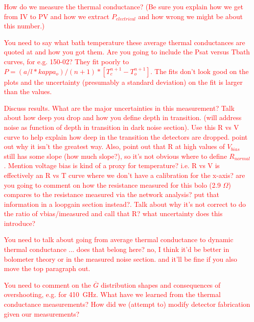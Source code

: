 
\textcolor{red}{How do we measure the thermal conductance? (Be sure you explain how we get from IV to PV and how we extract $P_{electrical}$ and how wrong we might be about this number.)}

\textcolor{red}{You need to say what bath temperature these average thermal conductances are quoted at and how you got them.}
\textcolor{red}{Are you going to include the Psat versus Tbath curves, for e.g. 150-02? They fit poorly to  $P = (a/l*kappa_{o})/(n+1)*[T_{c}^{n+1} - T_{o}^{n+1}]$. The fits don't look good on the plots and the uncertainty (presumably a standard deviation) on the fit is larger than the values.}

\textcolor{red}{Discuss results. What are the major uncertainties in this measurement? Talk about how deep you drop and how you define depth in transition. (will address noise as function of depth in transition in dark noise section).}
\textcolor{red}{Use this R vs V curve to help explain how deep in the transition the detectors are dropped. point out why it isn't the greatest way. Also, point out that R at high values of $V_{bias}$ still has some slope (how much slope?), so it's not obvious where to define $R_{normal}$. }
\textcolor{red}{Mention voltage bias is kind of a proxy for temperature? i.e. R vs V is effectively an R vs T curve where we don't have a calibration for the x-axis?}
\textcolor{red}{are you going to comment on how the resistance measured for this bolo (2.9 $\Omega$) compares to the resistance measured via the network analysis? put that information in a loopgain section instead?.}
\textcolor{red}{Talk about why it's not correct to do the ratio of vbias/imeasured and call that R? what uncertainty does this introduce?}

\textcolor{red}{You need to talk about going from average thermal conductance to dynamic thermal conductance ... does that belong here? no, I think it'd be better in bolometer theory or in the measured noise section. and it'll be fine if you also move the top paragraph out.} 

\textcolor{red}{You need to comment on the $\overline{G}$ distribution shapes and consequences of overshooting, e.g. for 410~GHz.}
\textcolor{red}{What have we learned from the thermal conductance measurements? How did we (attempt to) modify detector fabrication given our measurements?}


